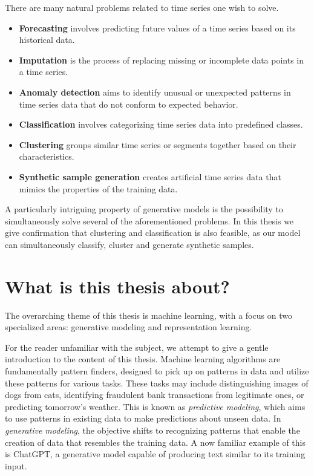 \documentclass[../../thesis.tex]{subfiles}
\begin{document}
There are many natural problems related to time series one wish to solve. 

\begin{itemize}
	\item \textbf{Forecasting} involves predicting future values of a time series based on its historical data. 

	\item  \textbf{Imputation} is the process of replacing missing or incomplete data points in a time series. 

	\item \textbf{Anomaly detection} aims to identify unusual or unexpected patterns in time series data that do not conform to expected behavior.

	\item \textbf{Classification} involves categorizing time series data into predefined classes.

	\item \textbf{Clustering} groups similar time series or segments together based on their characteristics.

	\item \textbf{Synthetic sample generation} creates artificial time series data that mimics the properties of the training data.
\end{itemize}

A particularly intriguing property of generative models is the possibility to simultaneously solve several of the aforementioned problems. In this thesis we give confirmation that clustering and classification is also feasible, as our model can simultaneously classify, cluster and generate synthetic samples.

\section{What is this thesis about?}

The overarching theme of this thesis is machine learning, with a focus on two specialized areas: generative modeling and representation learning.\newline

For the reader unfamiliar with the subject, we attempt to give a gentle introduction to the content of this thesis. Machine learning algorithms are fundamentally pattern finders, designed to pick up on patterns in data and utilize these patterns for various tasks. These tasks may include distinguishing images of dogs from cats, identifying fraudulent bank transactions from legitimate ones, or predicting tomorrow's weather. This is known as \textit{predictive modeling}, which aims to use patterns in existing data to make predictions about unseen data. In \textit{generative modeling}, the objective shifts to recognizing patterns that enable the creation of data that resembles the training data. A now familiar example of this is ChatGPT, a generative model capable of producing text similar to its training input.\newline
\end{document}
